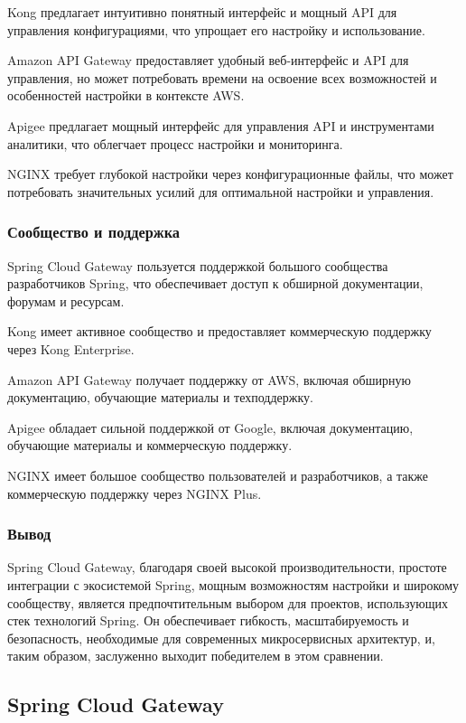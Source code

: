 Kong предлагает интуитивно понятный интерфейс и мощный API для управления конфигурациями, что упрощает его настройку и
использование.

Amazon API Gateway предоставляет удобный веб-интерфейс и API для управления, но может потребовать времени на освоение
всех возможностей и особенностей настройки в контексте AWS\@.

Apigee предлагает мощный интерфейс для управления API и инструментами аналитики, что облегчает процесс настройки и
мониторинга.

NGINX требует глубокой настройки через конфигурационные файлы, что может потребовать значительных усилий для оптимальной
настройки и управления.

\subsubsection{Сообщество и поддержка}

Spring Cloud Gateway пользуется поддержкой большого сообщества разработчиков Spring, что обеспечивает доступ к обширной
документации, форумам и ресурсам.

Kong имеет активное сообщество и предоставляет коммерческую поддержку через Kong Enterprise.

Amazon API Gateway получает поддержку от AWS, включая обширную документацию, обучающие материалы и техподдержку.

Apigee обладает сильной поддержкой от Google, включая документацию, обучающие материалы и коммерческую поддержку.

NGINX имеет большое сообщество пользователей и разработчиков, а также коммерческую поддержку через NGINX Plus.

\subsubsection{Вывод}

Spring Cloud Gateway, благодаря своей высокой производительности, простоте интеграции с экосистемой Spring, мощным
возможностям настройки и широкому сообществу, является предпочтительным выбором для проектов, использующих стек
технологий Spring.
Он обеспечивает гибкость, масштабируемость и безопасность, необходимые для современных микросервисных
архитектур, и, таким образом, заслуженно выходит победителем в этом сравнении.

\subsection{Spring Cloud Gateway}

